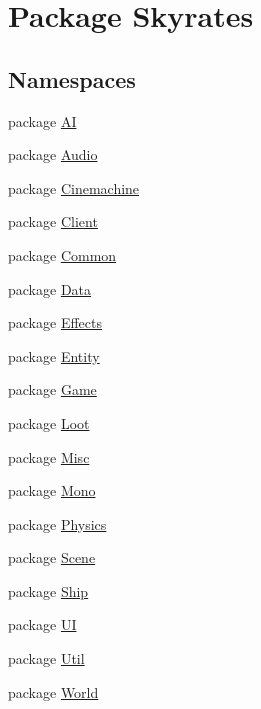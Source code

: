\hypertarget{namespace_skyrates}{\section{Package Skyrates}
\label{namespace_skyrates}
}
\subsection*{Namespaces}
\begin{DoxyCompactItemize}
\item 
package \hyperlink{namespace_skyrates_1_1_a_i}{A\-I}
\item 
package \hyperlink{namespace_skyrates_1_1_audio}{Audio}
\item 
package \hyperlink{namespace_skyrates_1_1_cinemachine}{Cinemachine}
\item 
package \hyperlink{namespace_skyrates_1_1_client}{Client}
\item 
package \hyperlink{namespace_skyrates_1_1_common}{Common}
\item 
package \hyperlink{namespace_skyrates_1_1_data}{Data}
\item 
package \hyperlink{namespace_skyrates_1_1_effects}{Effects}
\item 
package \hyperlink{namespace_skyrates_1_1_entity}{Entity}
\item 
package \hyperlink{namespace_skyrates_1_1_game}{Game}
\item 
package \hyperlink{namespace_skyrates_1_1_loot}{Loot}
\item 
package \hyperlink{namespace_skyrates_1_1_misc}{Misc}
\item 
package \hyperlink{namespace_skyrates_1_1_mono}{Mono}
\item 
package \hyperlink{namespace_skyrates_1_1_physics}{Physics}
\item 
package \hyperlink{namespace_skyrates_1_1_scene}{Scene}
\item 
package \hyperlink{namespace_skyrates_1_1_ship}{Ship}
\item 
package \hyperlink{namespace_skyrates_1_1_u_i}{U\-I}
\item 
package \hyperlink{namespace_skyrates_1_1_util}{Util}
\item 
package \hyperlink{namespace_skyrates_1_1_world}{World}
\end{DoxyCompactItemize}
